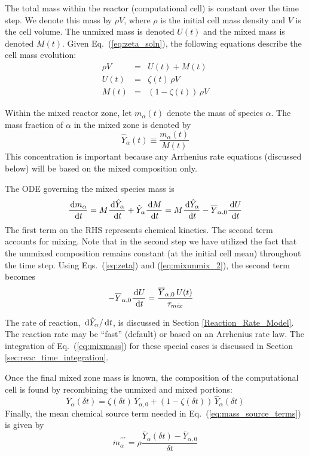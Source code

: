 The total mass within the reactor (computational cell) is constant over the time step.  We denote this mass by $\rho V$, where $\rho$ is the initial cell mass density and $V$ is the cell volume.  The unmixed mass is denoted $U(t)$ and the mixed mass is denoted $M(t)$.  Given Eq.~(\ref{eq:zeta_soln}), the following equations describe the cell mass evolution:
\begin{eqnarray}
\label{eq:mixunmix_1} \rho V &=& U(t) + M(t) \\
\label{eq:mixunmix_2} U(t) &=& \zeta(t)\,\rho V \\
\label{eq:mixunmix_3} M(t) &=& (1-\zeta(t))\,\rho V
\end{eqnarray}

Within the mixed reactor zone, let $m_\alpha(t)$ denote the mass of species $\alpha$.  The mass fraction of $\alpha$ in the mixed zone is denoted by
\begin{equation}\label{eq:mass_fraction_mixed}
\hat{Y}_{\alpha}(t)\equiv\frac{m_{\alpha}(t)}{M(t)}
\end{equation}
This concentration is important because any Arrhenius rate equations (discussed below) will be based on the mixed composition only.

The ODE governing the mixed species mass is
\begin{equation}\label{eq:mixmass}
\frac{\,\mathrm{d} m_{\alpha}}{\,\mathrm{d} t} = M \frac{\,\mathrm{d} \hat{Y}_\alpha}{\,\mathrm{d} t} + \hat{Y}_\alpha \frac{\,\mathrm{d} M}{\,\mathrm{d} t} = M \frac{\,\mathrm{d} \hat{Y}_\alpha}{\,\mathrm{d} t} - \overline{Y}_{\alpha,0} \frac{\,\mathrm{d} U}{\,\mathrm{d} t}
\end{equation}
The first term on the RHS represents chemical kinetics.  The second term accounts for mixing.  Note that in the second step we have utilized the fact that the ummixed composition remains constant (at the initial cell mean) throughout the time step. Using Eqs.~(\ref{eq:zeta}) and (\ref{eq:mixunmix_2}), the second term becomes
\begin{align}
\label{eq:mixingstep}
-\overline{Y}_{\alpha,0} \frac{\,\mathrm{d} U}{\,\mathrm{d} t} &= \frac{\overline{Y}_{\alpha,0} \, U(t) }{\tau_{mix}}
\end{align}

The rate of reaction, $\,\mathrm{d} \hat{Y}_\alpha/\,\mathrm{d} t$, is discussed in Section \ref{Reaction_Rate_Model}. The reaction rate may be ``fast'' (default) or based on an Arrhenius rate law.  The integration of Eq.~(\ref{eq:mixmass}) for these special cases is discussed in Section \ref{sec:reac_time_integration}.

Once the final mixed zone mass is known, the composition of the computational cell is found by recombining the unmixed and mixed portions:
\begin{equation}\label{eq:final_comp}
\overline{Y}_{\alpha}(\delta t)= \zeta(\delta t) \, \overline{Y}_{\alpha,0} + (1-\zeta(\delta t)) \, \hat{Y}_{\alpha}(\delta t)
\end{equation}
Finally, the mean chemical source term needed in Eq.~(\ref{eq:mass_source_terms}) is given by
\begin{equation}\label{mass_prod_rate}
\dot{m}^{\prime\prime\prime}_{\alpha} = \rho \frac{\overline{Y}_{\alpha}(\delta t) - \overline{Y}_{\alpha,0}}{\delta t}
\end{equation}

